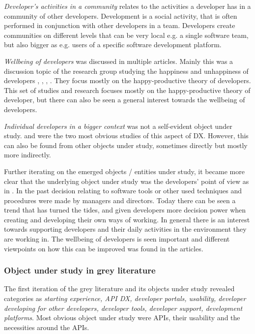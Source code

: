 \documentclass[english, 12pt, a4paper, sci, utf8, a-1b, online]{aaltothesis}
\begin{document}
\textit{Developer's activities in a community} relates to the activities a developer has in a community of other developers. Development is a social activity, that is often performed in conjunction with other developers in a team. Developers create communities on different levels that can be very local e.g. a single software team, but also bigger as e.g. users of a specific software development platform.

\textit{Wellbeing of developers} was discussed in multiple articles. Mainly this was a discussion topic of the research group studying the happiness and unhappiness of developers \parencite{what-happens-when-unhappy}, \parencite{unhappy-developers}, \parencite{consequences-of-unhappiness}, \parencite{on-the-unhappiness}. They focus mostly on the happy-productive theory of developers. This set of studies and research focuses mostly on the happy-productive theory of developer, but there can also be seen a general interest towards the wellbeing of developers.

\textit{Individual developers in a bigger context} was not a self-evident object under study. \textcite{entering-an-ecosystem} and \textcite{fagerholm2014examining} were the two most obvious studies of this aspect of DX. However, this can also be found from other objects under study, sometimes directly but mostly more indirectly.

Further iterating on the emerged objects / entities under study, it became more clear that the underlying object under study was the developers' point of view as in \textcite{voice-of-the-developer}. In the past decision relating to software tools or other used techniques and procedures were made by managers and directors. Today there can be seen a trend that has turned the tides, and given developers more decision power when creating and developing their own ways of working. In general there is an interest towards supporting developers and their daily activities in the environment they are working in. The wellbeing of developers is seen important and different viewpoints on how this can be improved was found in the articles.

\subsubsection{Object under study in grey literature}

The first iteration of the grey literature and its objects under study revealed categories as \textit{starting experience, API DX, developer portals, usability, developer developing for other developers, developer tools, developer support, development platforms}. Most obvious object under study were APIs, their usability and the necessities around the APIs.
\end{document}
